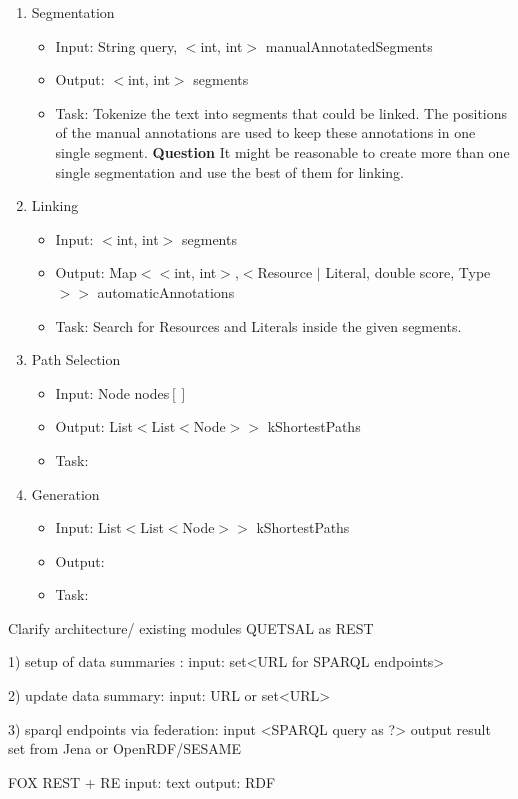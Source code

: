 \documentclass{scrartcl}
\begin{document}
\begin{enumerate}
\item Segmentation
	\begin{itemize}
		\item Input: String query, $<$int, int$>$ manualAnnotatedSegments
		\item Output: $<$int, int$>$ segments
		\item Task: Tokenize the text into segments that could be linked. The positions of the manual annotations are used to keep these annotations in one single segment. \textbf{Question} It might be reasonable to create more than one single segmentation and use the best of them for linking.
	\end{itemize}
\item Linking
	\begin{itemize}
		\item Input: $<$int, int$>$ segments
		\item Output: Map$<<$int, int$>$,$<$Resource $|$ Literal, double score, Type$>>$ automaticAnnotations
		\item Task: Search for Resources and Literals inside the given segments.
	\end{itemize}
\item Path Selection
	\begin{itemize}
		\item Input: Node nodes$[]$
		\item Output: List$<$List$<$Node$>>$ kShortestPaths
		\item Task:
	\end{itemize}
\item Generation
	\begin{itemize}
		\item Input: List$<$List$<$Node$>>$ kShortestPaths
		\item Output: 
		\item Task:
	\end{itemize}
\end{enumerate}

Clarify architecture/ existing modules
QUETSAL as REST

1) setup of data summaries : 
input: set<URL for SPARQL endpoints>

2) update data summary:
 input: URL or set<URL>

3) sparql endpoints via federation: 
input <SPARQL query as ?>
output result set from Jena or OpenRDF/SESAME

FOX REST + RE
input: text
output: RDF
\end{document}
